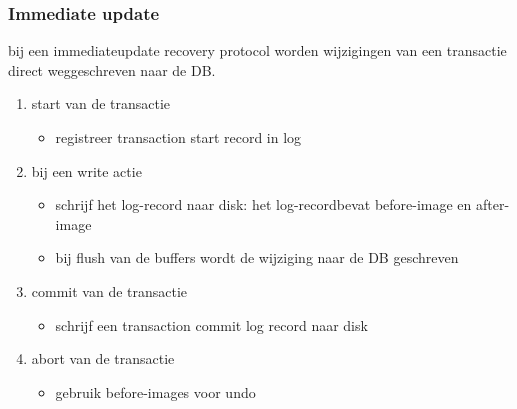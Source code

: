\documentclass[a4paper,12pt]{article}
\begin{document}
\subsubsection{Immediate update}
bij een immediateupdate recovery protocol worden wijzigingen van een transactie direct weggeschreven naar de DB.
\begin{enumerate}
\item start van de transactie
	\begin{itemize}
	\item registreer transaction start record in log
	\end{itemize}
\item bij een write actie
	\begin{itemize}
	\item schrijf het log-record naar disk: het log-recordbevat before-image en after-image
	\item bij flush van de buffers wordt de wijziging naar de DB geschreven
	\end{itemize}
\item commit van de transactie
	\begin{itemize}
	\item schrijf een transaction commit log record naar disk
	\end{itemize}
\item abort van de transactie
	\begin{itemize}
	\item gebruik before-images voor undo
	\end{itemize}
\end{enumerate}
\end{document}
